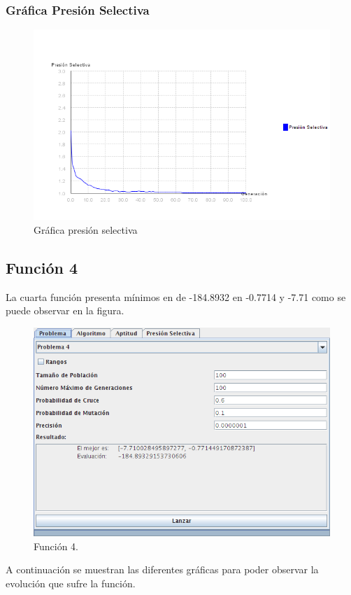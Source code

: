 \documentclass[12pt]{article}
\begin{document}
\subsubsection*{Gráfica Presión Selectiva}
\begin{figure}[H]
\centering
\includegraphics[scale=0.5]{graficas/F3inicial_presion}
\caption{Gráfica presión selectiva}
\label{fig}
\end{figure}
\newpage

\subsection{Función 4}
	La cuarta función presenta mínimos en de -184.8932 en -0.7714 y -7.71 como se puede observar en la figura.
\begin{figure}[H]
\centering
\includegraphics[scale=0.5]{graficas/F4inicial}
\caption{Función 4.}
\label{fig}
\end{figure}
	A continuación se muestran las diferentes gráficas para poder observar la evolución que sufre la función.
\end{document}
